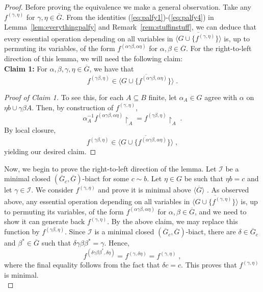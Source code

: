 \documentclass{article}
\theoremstyle{remark}
\theoremstyle{definition}
\begin{document}
\begin{proof}  Before proving the equivalence we make a general observation. Take any $f^{(\gamma, \eta)}$ for $\gamma, \eta\in\overline{G}$. From the identities (\ref{eq:palfy1})-(\ref{eq:palfy4}) in Lemma~\ref{lem:everythingpalfy} and Remark~\ref{rem:stuffinstuff}, we can deduce that every essential operation depending on all variables in $\overline{\langle G\cup\{f^{(\gamma, \eta)}\}\rangle}$ is, up to permuting its variables, of the form $f^{(\alpha\gamma\beta, \alpha\eta)}$ for $\alpha, \beta\in\overline{G}$. {For the right-to-left direction of this lemma, we will need the following claim:}\\

\textbf{Claim 1:} {For $\alpha, \beta, \gamma, \eta\in\overline{G}$, we have that}
\[f^{(\gamma\beta, \eta)}\in \overline{\langle G\cup\{f^{(\alpha\gamma\beta, \alpha\eta)}\}\rangle}\;.\]
\begin{proof}[Proof of Claim 1]
To see this, for each $A\subseteq B$ finite, let $\alpha_A\in G$ agree with $\alpha$ on $\eta b\cup\gamma\beta A$. Then, by construction of $f^{(\gamma, \eta)}$,
    \[\alpha_A^{-1}f^{(\alpha\gamma\beta, \alpha\eta)}\upharpoonright_{A}=f^{(\gamma\beta, \eta)}\upharpoonright_{A}\;.\]
{By local closure, }
\[f^{(\gamma\beta, \eta)}\in\overline{\langle G\cup\{f^{(\alpha\gamma\beta, \alpha\eta)}\}\rangle}\;,\] yielding our desired claim.
\end{proof}
Now, we begin to prove the right-to-left direction of the lemma. Let $\mathcal{I}$ be a minimal closed $(\overline{G}_c, \overline{G})$-biact for some $c\sim b$. Let $\eta\in G$ be such that $\eta b=c$ and let $\gamma\in\mathcal{I}$. We consider $f^{(\gamma, \eta)}$ and prove it is minimal above $\overline{\langle G\rangle}$ . {As observed above, any  essential operation depending on all variables in $\overline{\langle G\cup\{f^{(\gamma, \eta)}\}\rangle}$ is, up to permuting its variables, of the form $f^{(\alpha\gamma\beta, \alpha\eta)}$ for {$\alpha, \beta\in\overline{G}$}, and we need to show it can generate back $f^{(\gamma, \eta)}$. By the above claim, we may replace this function by $f^{(\gamma\beta, \eta)}$.}
Since $\mathcal{I}$ is a minimal closed $(\overline{G}_c, \overline{G})$-biact, there are $\delta\in \overline{G}_c$ and $\beta^*\in\overline{G}$ such that $\delta\gamma\beta\beta^*=\gamma$. Hence, \[f^{(\delta\gamma\beta\beta^*, \delta\eta)}=f^{(\gamma, \delta\eta)}=f^{(\gamma, \eta)}\;,\]
where the final equality follows from the fact that $\delta c=c$. This proves that $f^{(\gamma, \eta)}$ is minimal.\\


\end{proof}
\end{document}
